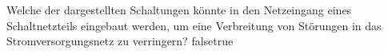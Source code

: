     {Welche der dargestellten Schaltungen könnte in den Netzeingang eines Schaltnetzteils eingebaut werden, um eine Verbreitung von Störungen in das Stromversorgungsnetz zu verringern?}
    {}
    {}
    {}
    {}
    {false}{true}